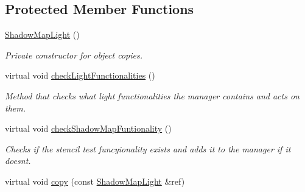\subsection*{Protected Member Functions}
\begin{DoxyCompactItemize}
\item 
\mbox{\label{class_geometry_engine_1_1_geometry_world_item_1_1_geometry_light_1_1_shadow_map_light_affc9857a0ced35eaaa1be2bedb77fe30}} 
\mbox{\hyperlink{class_geometry_engine_1_1_geometry_world_item_1_1_geometry_light_1_1_shadow_map_light_affc9857a0ced35eaaa1be2bedb77fe30}{Shadow\+Map\+Light}} ()
\begin{DoxyCompactList}\small\item\em Private constructor for object copies. \end{DoxyCompactList}\item 
\mbox{\label{class_geometry_engine_1_1_geometry_world_item_1_1_geometry_light_1_1_shadow_map_light_a3597ef633b7be97c6186361046ecfa25}} 
virtual void \mbox{\hyperlink{class_geometry_engine_1_1_geometry_world_item_1_1_geometry_light_1_1_shadow_map_light_a3597ef633b7be97c6186361046ecfa25}{check\+Light\+Functionalities}} ()
\begin{DoxyCompactList}\small\item\em Method that checks what light functionalities the manager contains and acts on them. \end{DoxyCompactList}\item 
\mbox{\label{class_geometry_engine_1_1_geometry_world_item_1_1_geometry_light_1_1_shadow_map_light_afd25af97313a9d794e098aca7d883e4d}} 
virtual void \mbox{\hyperlink{class_geometry_engine_1_1_geometry_world_item_1_1_geometry_light_1_1_shadow_map_light_afd25af97313a9d794e098aca7d883e4d}{check\+Shadow\+Map\+Funtionality}} ()
\begin{DoxyCompactList}\small\item\em Checks if the stencil test funcyionality exists and adds it to the manager if it doesn\textquotesingle{}t. \end{DoxyCompactList}\item 
virtual void \mbox{\hyperlink{class_geometry_engine_1_1_geometry_world_item_1_1_geometry_light_1_1_shadow_map_light_a778fdb3b00c8b930e03ebbde77c9433c}{copy}} (const \mbox{\hyperlink{class_geometry_engine_1_1_geometry_world_item_1_1_geometry_light_1_1_shadow_map_light}{Shadow\+Map\+Light}} \&ref)
\end{DoxyCompactItemize}
